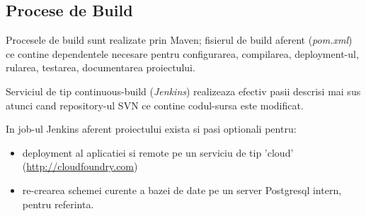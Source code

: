 \subsection{Procese de Build}
Procesele de build sunt realizate prin Maven;
fisierul de build aferent (\emph{pom.xml})
ce contine dependentele necesare pentru configurarea, compilarea,
deployment-ul, rularea, testarea, documentarea proiectului.

Serviciul de tip continuous-build (\emph{Jenkins}) 
realizeaza efectiv pasii descrisi mai sus 
atunci cand repository-ul SVN ce contine codul-sursa este modificat. 

In job-ul Jenkins aferent proiectului exista si pasi optionali pentru:
\begin{itemize}
\item
deployment al aplicatiei si remote pe un
serviciu de tip 'cloud' (\url{http://cloudfoundry.com}) 
\item
re-crearea schemei curente a bazei de date pe un server Postgresql intern,
pentru referinta.
\end{itemize}

